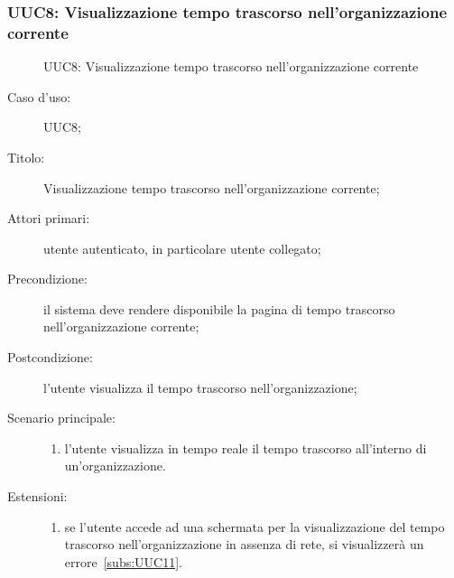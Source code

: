 \documentclass[../../../analisi-dei-requisiti.tex]{subfiles}
\begin{document}
\subsubsection{UUC8: Visualizzazione tempo trascorso nell'organizzazione corrente}%
\label{subs:UUC8}

\begin{figure}[H]
  \centering
  \caption{UUC8: Visualizzazione tempo trascorso nell'organizzazione corrente}%
  \label{fig:UUC8}
\end{figure}

\begin{description}
  \item[Caso d'uso:] UUC8;
  \item[Titolo:] Visualizzazione tempo trascorso nell'organizzazione corrente;
  \item[Attori primari:] utente autenticato, in particolare utente collegato;
  \item[Precondizione:] il sistema deve rendere disponibile la pagina di tempo trascorso nell'organizzazione corrente;
  \item[Postcondizione:] l'utente visualizza il tempo trascorso nell'organizzazione;
  \item[Scenario principale:]
        \begin{enumerate}
          \item l'utente visualizza in tempo reale il tempo trascorso all'interno di un'organizzazione.
        \end{enumerate}
  \item[Estensioni:]
        \begin{enumerate}
          \item se l'utente accede ad una schermata per la visualizzazione del tempo trascorso nell'organizzazione in assenza di rete, si visualizzerà un errore~\ref{subs:UUC11}.
        \end{enumerate}
\end{description}
\end{document}
